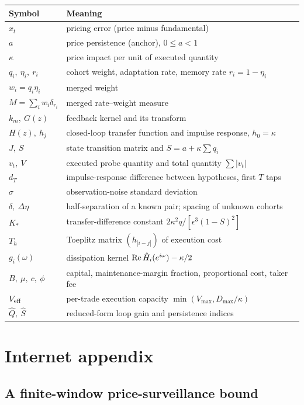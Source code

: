 \documentclass[12pt]{article}
\theoremstyle{definition}
\theoremstyle{remark}
\begin{document}
\begin{longtable}{p{}p{}}
\toprule
Symbol & Meaning\\
\midrule
\endhead
$x_t$ & pricing error (price minus fundamental)\\
$a$ & price persistence (anchor), $0\le a<1$\\
$\kappa$ & price impact per unit of executed quantity\\
$q_i,\ \eta_i,\ r_i$ & cohort weight, adaptation rate, memory rate $r_i=1-\eta_i$\\
$w_i=q_i\eta_i$ & merged weight\\
$M=\sum_iw_i\delta_{r_i}$ & merged rate--weight measure\\
$k_m,\ G(z)$ & feedback kernel and its transform\\
$H(z),\ h_j$ & closed-loop transfer function and impulse response, $h_0=\kappa$\\
$J,\ S$ & state transition matrix and $S=a+\kappa\sum q_i$\\
$v_t,\ V$ & executed probe quantity and total quantity $\sum|v_t|$\\
$d_T$ & impulse-response difference between hypotheses, first $T$ taps\\
$\sigma$ & observation-noise standard deviation\\
$\delta,\ \Delta\eta$ & half-separation of a known pair; spacing of unknown cohorts\\
$K_*$ & transfer-difference constant $2\kappa^2q/[\epsilon^3(1-S)^2]$\\
$T_h$ & Toeplitz matrix $(h_{|i-j|})$ of execution cost\\
$g_i(\omega)$ & dissipation kernel ${\rm Re}\,\hat H_i(e^{i\omega})-\kappa/2$\\
$B,\ \mu,\ c,\ \phi$ & capital, maintenance-margin fraction, proportional cost, taker fee\\
$V_{\rm eff}$ & per-trade execution capacity $\min(V_{\max},D_{\max}/\kappa)$\\
$\hat Q,\ \hat S$ & reduced-form loop gain and persistence indices\\
\bottomrule
\end{longtable}

\section{Internet appendix}\label{app:ia}

\subsection{A finite-window price-surveillance bound}
\end{document}
